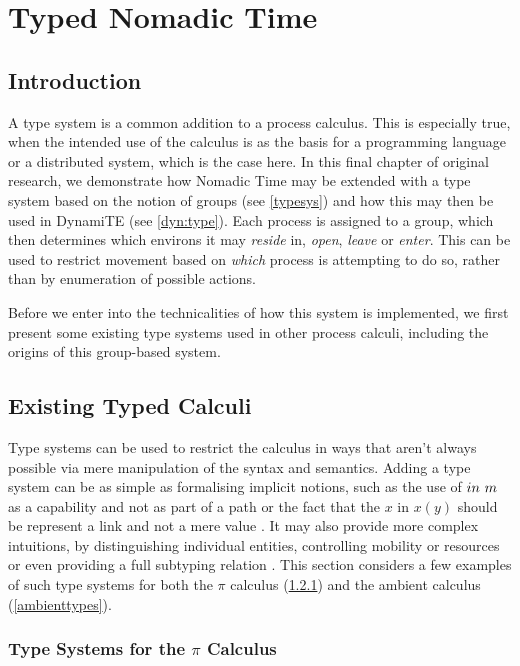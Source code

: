 
\chapter{Typed Nomadic Time}
\label{tnt}

\section{Introduction}

A type system is a common addition to a process calculus.  This is
especially true, when the intended use of the calculus is as the basis
for a programming language or a distributed system, which is the case
here.  In this final chapter of original research, we demonstrate how
Nomadic Time may be extended with a type system based on the notion of
groups (see \ref{typesys}) and how this may then be used in DynamiTE
(see \ref{dyn:type}).  Each process is assigned to a group, which then
determines which environs it may \emph{reside} in, \emph{open},
\emph{leave} or \emph{enter}.  This can be used to restrict movement
based on \emph{which} process is attempting to do so, rather than by
enumeration of possible actions.

Before we enter into the technicalities of how this system is
implemented, we first present some existing type systems used in other
process calculi, including the origins of this group-based system.

\section{Existing Typed Calculi}
\label{typedcalculi}

Type systems can be used to restrict the calculus in ways that aren't
always possible via mere manipulation of the syntax and semantics.
Adding a type system can be as simple as formalising implicit notions,
such as the use of $in\ m$ as a capability and not as part of a
path \cite{ambienttypes} or the fact that the $x$ in $x(y)$ should be
represent a link and not a mere value \cite{sangiorgi:types-or}.  It
may also provide more complex intuitions, by distinguishing individual
entities, controlling mobility \cite{sangiorgi:mobsafeambients,
  ambienttypes} or resources \cite{hennessy:dpi98} or even providing a
full subtyping relation \cite{sangiorgi:typing, boxedamb02}.  This
section considers a few examples of such type systems for both the
$\pi$ calculus (\ref{pitypes}) and the ambient calculus
(\ref{ambienttypes}).\subsection{Type Systems for the $\pi$ Calculus}
\label{pitypes}

